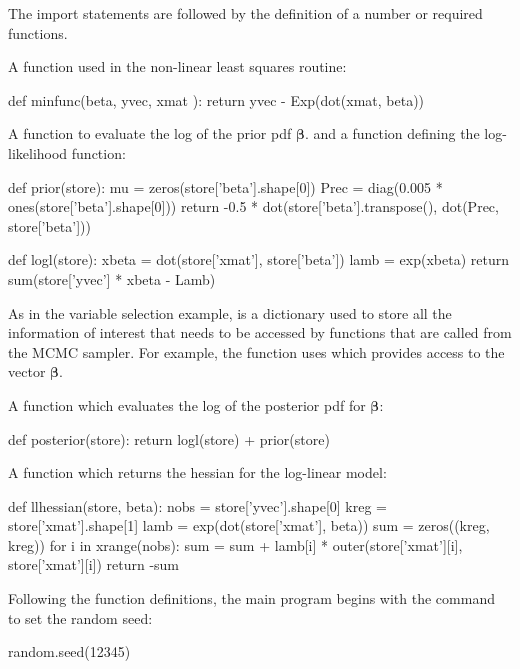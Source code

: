\documentclass[article]{jss}
\begin{document}
The import statements are followed by the definition of a number or
required functions.

A function  used in the non-linear least squares routine:
\begin{Code}
def minfunc(beta, yvec, xmat ):
    return yvec - Exp(dot(xmat, beta))
\end{Code}

A function  to evaluate the log of the prior pdf
$\bm{\beta}.$ and a function  defining the log-likelihood
function:

\begin{Code}
def prior(store):
    mu = zeros(store['beta'].shape[0])
    Prec = diag(0.005 * ones(store['beta'].shape[0]))
    return -0.5 * dot(store['beta'].transpose(), dot(Prec, store['beta']))

def logl(store):
    xbeta = dot(store['xmat'], store['beta'])
    lamb = exp(xbeta)
    return sum(store['yvec'] * xbeta - Lamb)
\end{Code}

As in the variable selection example,  is a
 dictionary used to store all the information of
interest that needs to be accessed by functions that are called from
the MCMC sampler. For example, the function  uses
 which provides access to the vector $\bm{\beta}.$


A function  which evaluates the log
of the posterior pdf for $\bm{\beta}$:

\begin{Code}
def posterior(store):
    return logl(store) + prior(store)
\end{Code}

A function  which returns the hessian for the
log-linear model:

\begin{Code}
def llhessian(store, beta):
    nobs = store['yvec'].shape[0]
    kreg = store['xmat'].shape[1]
    lamb = exp(dot(store['xmat'], beta))
    sum = zeros((kreg, kreg))
    for i in xrange(nobs):
        sum = sum + lamb[i] * outer(store['xmat'][i], store['xmat'][i])
    return -sum
\end{Code}

Following the function definitions, the main program begins with the
command to set the random seed:
\begin{Code}
random.seed(12345)      
\end{Code}
\end{document}

